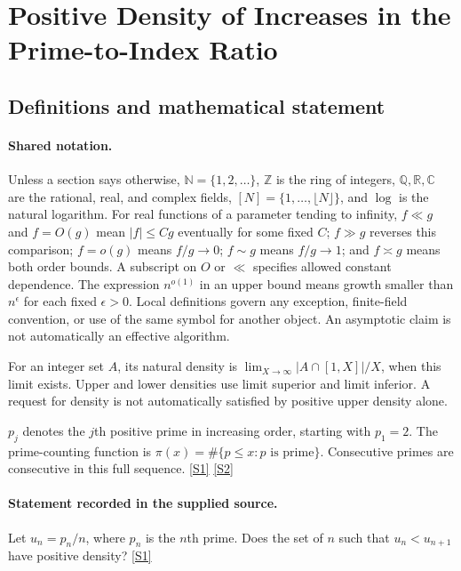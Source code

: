 \documentclass[11pt,a4paper]{article}
\newcommand{\N}{\mathbb{N}}
\newcommand{\Z}{\mathbb{Z}}
\newcommand{\Q}{\mathbb{Q}}
\newcommand{\R}{\mathbb{R}}
\newcommand{\C}{\mathbb{C}}
\newcommand{\sref}[2]{\hyperlink{source:#1:#2}{[S#2]}}
\begin{document}
\section{Positive Density of Increases in the Prime-to-Index Ratio}\label{statement}


\subsection{Definitions and mathematical statement}

\paragraph{Shared notation.}Unless a section says otherwise, $\N=\{1,2,\ldots\}$,
$\Z$ is the ring of integers, $\Q,\R,\C$ are the rational, real, and complex
fields, $[N]=\{1,\ldots,\lfloor N\rfloor\}$, and $\log$ is the natural
logarithm. For real functions of a parameter tending to infinity,
$f\ll g$ and $f=O(g)$ mean $|f|\leq Cg$ eventually for some fixed $C$;
$f\gg g$ reverses this comparison; $f=o(g)$ means $f/g\to0$;
$f\sim g$ means $f/g\to1$; and $f\asymp g$ means both order bounds.
A subscript on $O$ or $\ll$ specifies allowed constant dependence.
The expression $n^{o(1)}$ in an upper bound means growth smaller than
$n^\epsilon$ for each fixed $\epsilon>0$. Local definitions govern any
exception, finite-field convention, or use of the same symbol for another
object. An asymptotic claim is not automatically an effective algorithm.



For an integer set $A$, its natural density is $\lim_{X\to\infty}|A\cap[1,X]|/X$, when this limit exists. Upper and lower densities use limit superior and limit inferior. A request for density is not automatically satisfied by positive upper density alone.

$p_j$ denotes the $j$th positive prime in increasing order, starting with $p_1=2$. The prime-counting function is $\pi(x)=\#\{p\leq x:p\text{ is prime}\}$. Consecutive primes are consecutive in this full sequence. \sref{statement}{1} \sref{statement}{2}

\paragraph{Statement recorded in the supplied source.}
Let $u_n=p_n/n$, where $p_n$ is the $n$th prime. Does the set of $n$ such that $u_n<u_{n+1}$ have positive density? \sref{statement}{1}
\end{document}
